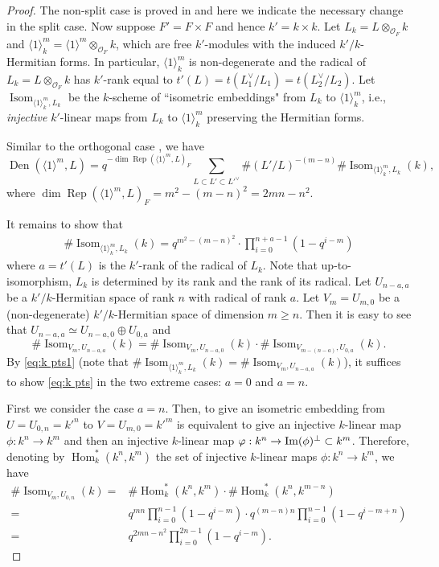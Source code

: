 \documentclass[reqno]{amsart}
\numberwithin{equation}{section}
\newcommand{\iden}{\langle1\rangle}
\DeclareMathOperator{\Hom}{Hom}
\DeclareMathOperator{\Rep}{Rep}
\DeclareMathOperator{\Isom}{Isom}
\DeclareMathOperator{\Den}{Den}
\newcommand\cO{\mathcal{O}}
\theoremstyle{remark}
\numberwithin{equation}{section}
\begin{document}
\begin{proof}
The non-split case is proved in \cite[Thm.~3.5.1]{LZ1} and here we indicate the necessary change in the split case.  Now suppose $F'=F\times F$ and hence $k'=k\times k$. Let $L_k=L\otimes_{\cO_F} k$ and $\iden^m_{k}=\iden^m\otimes_{\cO_F} k$, which are free $k'$-modules with the induced $k'/k$-Hermitian forms. In particular, $\iden^m_{k}$ is non-degenerate and the radical of $L_k=L\otimes_{\cO_F} k$  has $k'$-rank equal to $t'(L)=t(L_1^\vee/L_1)=t(L_2^\vee/L_2)$. Let $\Isom_{\iden^m_{k}, L_k}$ be the $k$-scheme of ``isometric embeddings" from $L_k$ to  $\iden^m_{k}$, i.e., {\em injective} $k'$-linear maps from $L_k$ to  $\iden^m_{k}$ preserving the Hermitian forms.

Similar to the orthogonal case \cite[\S3.3]{CY},  we have
  $$
  \Den(\iden^m,L)= q^{-\dim \Rep(\iden^m,L)_{F}}\sum_{L\subset L'\subset L'^\vee} \# (L'/L)^{-(m-n)} \# \Isom_{\iden^m_{k}, L_k}(k),
  $$
  where $\dim \Rep(\iden^m,L)_{F}=m^2-(m-n)^2=2mn-n^2$.
  
  
It remains to show that 
  \begin{align}\label{eq:k pts}
   \#\Isom_{\iden^m_{k}, L_k}(k)= q^{m^2-(m-n)^2}\cdot \prod_{i=0}^{n+a-1}(1-q^{i-m})
  \end{align}
  where $a=t'(L)$ is the $k'$-rank of the radical of $L_k$. Note that up-to-isomorphism, $L_k$ is determined by its rank and the rank of its radical. Let $U_{n-a,a}$ be a $k'/k$-Hermitian space of rank $n$ with radical of rank $a$. Let $V_m=U_{m,0}$ be a (non-degenerate) $k'/k$-Hermitian space of dimension $m\ge n$. Then it is easy to see that $U_{n-a,a}\simeq U_{n-a,0}\oplus U_{0,a}$ and
  \begin{equation}\label{eq:k pts1}
 \# \Isom_{V_m, U_{n-a,a}}(k)= \# \Isom_{V_m, U_{n-a,0}}(k)\cdot\#  \Isom_{V_{m-(n-a)}, U_{0,a}}(k).
  \end{equation}
By \eqref{eq:k pts1} (note that $   \#\Isom_{\iden^m_{k}, L_k}(k)= \# \Isom_{V_m, U_{n-a,a}}(k)$), it suffices to show \eqref{eq:k pts} in the two extreme cases: $a=0$ and $a=n$.
 
 First we consider the case $a=n$. Then, to give an isometric embedding from $U=U_{0,n}=k'^n$ to $V=U_{m,0}=k'^m$ is equivalent to give an injective $k$-linear map $\phi:k^n\to k^m$ and then an injective $k$-linear map $\varphi:k^n\to {\rm Im}(\phi)^\perp\subset k^m$. Therefore, denoting  by $\Hom^*_k(k^n,k^m)$ the set of  injective $k$-linear maps $\phi:k^n\to k^m$, we have
  \begin{align*}
 \# \Isom_{V_{m}, U_{0,n}}(k)= &\#\Hom^*_k(k^n,k^m)\cdot  \#\Hom^*_k(k^n,k^{m-n})\\
 =&q^{mn}\prod_{i=0}^{n-1}(1-q^{i-m})\cdot  q^{(m-n)n}\prod_{i=0}^{n-1}(1-q^{i-m+n})
 \\=&  q^{2mn-n^2}\prod_{i=0}^{2n-1}(1-q^{i-m}).
  \end{align*}
  

\end{proof}
\end{document}
